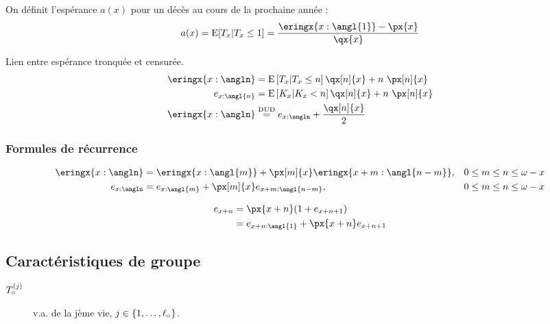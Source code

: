 \documentclass[10pt, french]{article}
\begin{document}
\begin{multicols*}{3}
\begin{definitionNOHFILLprop}
On définit l'espérance $a(x)$ pour un décès au cours de la prochaine année :
\begin{align*}
	a(x)
	&=	\text{E}[T_x | T_x \leq 1] 
	=	\frac{\eringx{x:\angl{1}} - \px{x}}{\qx{x}} \\	
\end{align*}
\end{definitionNOHFILLprop}

Lien entre espérance tronquée et censurée.
\begin{align*}
	\eringx{x:\angln}
	&=	\esp{T_x | T_x \leq n} \qx[n]{x} + n \ \px[n]{x} \\	
	e_{x:\angl{n}}
	&=	\esp{K_x | K_x < n} \qx[n]{x} + n \ \px[n]{x} \\	
	\eringx{x:\angln}
	&\overset{\text{DUD}}{=}	e_{x:\angln} + \frac{\qx[n]{x}}{2} 
\end{align*}


\subsubsection{Formules de récurrence}
\begin{align*}
	\eringx{x:\angln} 
	&=	\eringx{x:\angl{m}} + \px[m]{x} \eringx{x + m:\angl{n - m}}, & 0 \leq m \leq n \leq \omega - x  \\
	e_{x:\angln} 
	&=	e_{x:\angl{m}} + \px[m]{x} e_{x + m:\angl{n - m}}, & 0 \leq m \leq n \leq \omega - x  \\
\end{align*}

\begin{align*}
	e_{x + n} 
	&=	\px{x + n} (1 + e_{x + n + 1}) \\
	&=	e_{x + n:\angl{1}} + \px{x + n} e_{x + n + 1} 
\end{align*}


\columnbreak
\subsection{Caractéristiques de groupe}
\begin{description}
	\item[$T^{(j)}_{\textcolor{teal}{a}}$]	v.a. de la jème vie, $j \in \{1, \dots, \ell_{\textcolor{teal}{a}}\}$.
\end{description}


\end{multicols*}
\end{document}
